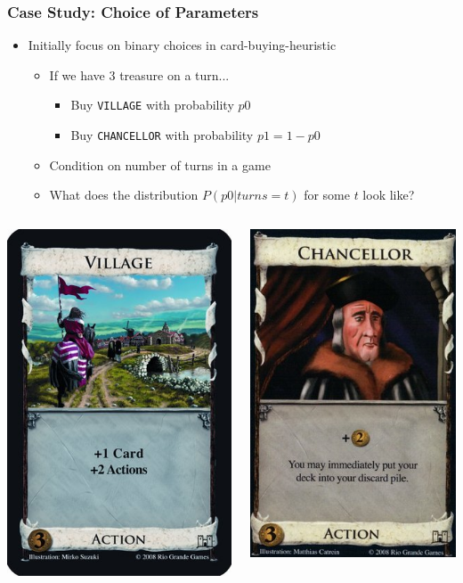 \begin{frame}[fragile=singleslide] \frametitle{Case Study: Choice of Parameters}
\begin{itemize}
\item Initially focus on binary choices in card-buying-heuristic
  \begin{itemize}
  \item If we have $3$ treasure on a turn...
    \begin{itemize}
    \item Buy \verb|VILLAGE| with probability $p0$
    \item Buy \verb|CHANCELLOR| with probability $p1 = 1 - p0$
    \end{itemize}
  \item Condition on number of turns in a game
  \item What does the distribution $P(p0 | turns = t)$ for some $t$ look like?
  \end{itemize}
\end{itemize}
\begin{columns}
   \begin{flushright} \includegraphics[width=.45\columnwidth]{village.jpg}    \end{flushright}
   \begin{flushleft}  \includegraphics[width=.45\columnwidth]{chancellor.jpg} \end{flushleft}

\end{columns}
\end{frame}
